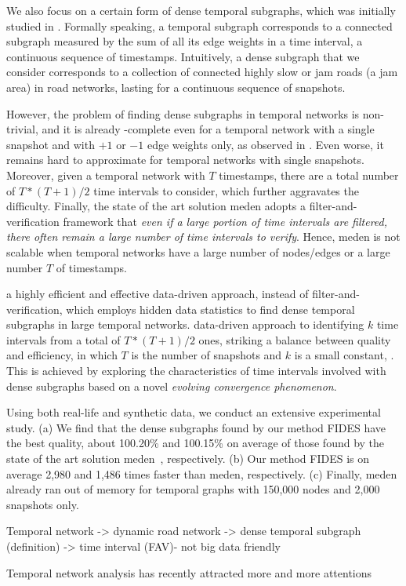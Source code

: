 We also focus on a certain form of dense temporal subgraphs, which was initially studied in \cite{BogdanovMS11}.
Formally speaking, a temporal subgraph corresponds to a connected subgraph measured by the sum of all its edge weights in a time interval, \ie  a continuous sequence of timestamps. Intuitively, a dense subgraph that we consider  corresponds to a  collection of connected highly slow or jam roads (\ie  a jam area) in road networks, lasting for a continuous sequence of snapshots.


However, the problem of  finding dense subgraphs in temporal networks is non-trivial, and it is already \NP-complete even for a temporal network with a single snapshot and with $+1$ or $-1$ edge weights only, as observed in \cite{BogdanovMS11}. Even worse, it remains hard to approximate for temporal networks  with single snapshots. Moreover, given a temporal network with $T$ timestamps, there are a total number of $T*(T+1)/2$ time intervals to consider, which further aggravates the difficulty. Finally, the state of the art solution {\sc meden} \cite{BogdanovMS11} adopts a filter-and-verification framework that {\em even if a large portion of time intervals are filtered, there often remain a large number of time intervals to verify}. Hence, {\sc meden} is not scalable when temporal networks have a large number of nodes/edges or a large number $T$ of timestamps.


 a highly efficient and effective data-driven approach, instead of filter-and-verification, which employs hidden data statistics to find dense temporal subgraphs in large temporal networks.  data-driven approach to identifying $k$ time intervals from a total of $T*(T+1)/2$ ones, striking a balance between quality and efficiency, in which $T$ is the number of snapshots and $k$ is a small constant, . This is achieved by exploring the characteristics of time intervals involved with dense subgraphs based on a novel {\em evolving convergence phenomenon}.



Using both real-life and synthetic data, we conduct an extensive experimental study.
(a) We find that the dense subgraphs found by our method {\sc FIDES} have the best quality, \ie about 100.20\% and 100.15\% on average of those found by the state of the art solution {\sc meden}~\cite{BogdanovMS11}, respectively.
(b) Our method {\sc FIDES} is  on average 2,980 and 1,486 times  faster than {\sc meden}, respectively.
(c) Finally, {\sc meden} already ran out of memory for temporal graphs with 150,000 nodes and 2,000 snapshots only.


Temporal network -> dynamic road network -> dense temporal subgraph (definition) -> time interval (FAV)- not big data friendly

Temporal network analysis
has recently attracted more and more attentions

